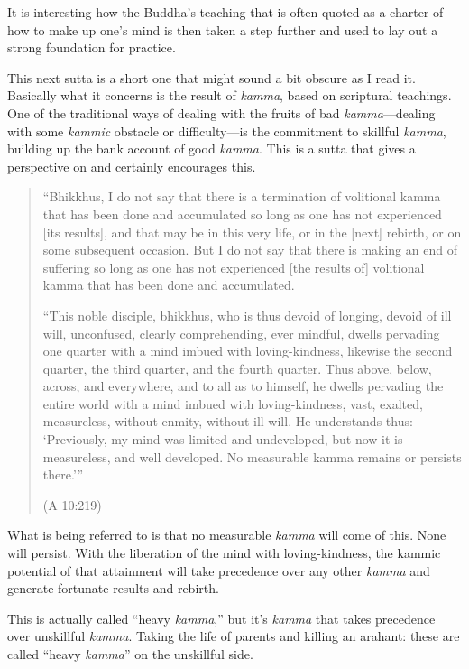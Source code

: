 It is interesting how the Buddha’s teaching that is often quoted as a
charter of how to make up one’s mind is then taken a step further and
used to lay out a strong foundation for practice.

This next sutta is a short one that might sound a bit obscure as I read
it. Basically what it concerns is the result of \emph{kamma}, based on
scriptural teachings. One of the traditional ways of dealing with the
fruits of bad \emph{kamma}—dealing with some \emph{kammic} obstacle or
difficulty—is the commitment to skillful \emph{kamma}, building up the
bank account of good \emph{kamma}. This is a sutta that gives a
perspective on and certainly encourages this.

\begin{quotation}
“Bhikkhus, I do not say that there is a termination of volitional kamma
that has been done and accumulated so long as one has not experienced
{[}its results{]}, and that may be in this very life, or in the
{[}next{]} rebirth, or on some subsequent occasion. But I do not say
that there is making an end of suffering so long as one has not
experienced {[}the results of{]} volitional kamma that has been done and
accumulated.

“This noble disciple, bhikkhus, who is thus devoid of longing, devoid of
ill will, unconfused, clearly comprehending, ever mindful, dwells
pervading one quarter with a mind imbued with loving-kindness, likewise
the second quarter, the third quarter, and the fourth quarter. Thus
above, below, across, and everywhere, and to all as to himself, he
dwells pervading the entire world with a mind imbued with
loving-kindness, vast, exalted, measureless, without enmity, without ill
will. He understands thus: ‘Previously, my mind was limited and
undeveloped, but now it is measureless, and well developed. No
measurable kamma remains or persists there.’”

\hfill(A 10:219)
\end{quotation}

What is being referred to is that no measurable \emph{kamma} will come
of this. None will persist. With the liberation of the mind with
loving-kindness, the kammic potential of that attainment will take
precedence over any other \emph{kamma} and generate fortunate results
and rebirth.

This is actually called “heavy \emph{kamma},” but it’s \emph{kamma} that
takes precedence over unskillful \emph{kamma}. Taking the life of
parents and killing an arahant: these are called “heavy \emph{kamma}” on
the unskillful side.

